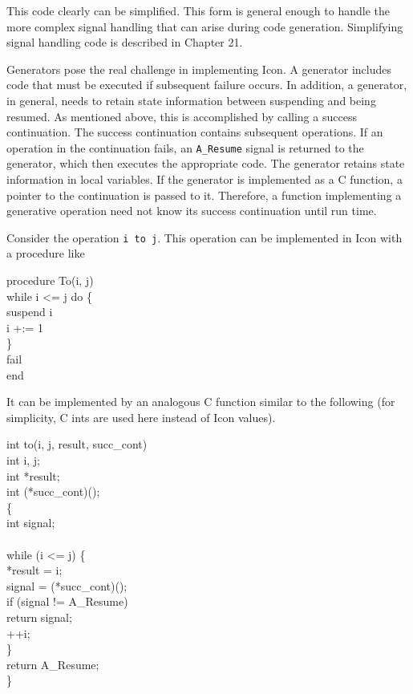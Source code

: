 This code clearly can be simplified. This form is general enough to
handle the more complex signal handling that can arise during code
generation. Simplifying signal handling code is described in Chapter
21.


Generators pose the real challenge in implementing Icon. A generator
includes code that must be executed if subsequent failure occurs. In
addition, a generator, in general, needs to retain state information
between suspending and being resumed. As mentioned above, this is
accomplished by calling a success continuation. The success
continuation contains subsequent operations. If an operation in the
continuation fails, an \texttt{A\_Resume} signal is returned to the generator,
which then executes the appropriate code. The generator retains state
information in local variables. If the generator is implemented as a C
function, a pointer to the continuation is passed to it. Therefore, a
function implementing a generative operation need not know its success
continuation until run time.


Consider the operation \texttt{i to j}. This operation can be
implemented in Icon with a procedure like

\goodbreak
\begin{iconcode}
procedure To(i, j)\\
\>while i <= j do \{\\
\>\>suspend i\\
\>\>i +:= 1\\
\>\}\\
\>fail\\
end\\
\end{iconcode}


It can be implemented by an analogous C function similar to the
following (for simplicity, C ints are used here instead of Icon
values).

\goodbreak
\begin{iconcode}
int to(i, j, result, succ\_cont)\\
\>int i, j;\\
\>int *result;\\
\>int (*succ\_cont)();\\
\{\\
\>int signal;\\
\\
\>while (i <= j) \{\\
\>\>*result = i;\\
\>\>signal = (*succ\_cont)();\\
\>\>if (signal != A\_Resume)\\
\>\>\>return signal;\\
\>\>++i;\\
\>\}\\
\>return A\_Resume;\\
\}\\
\end{iconcode}

